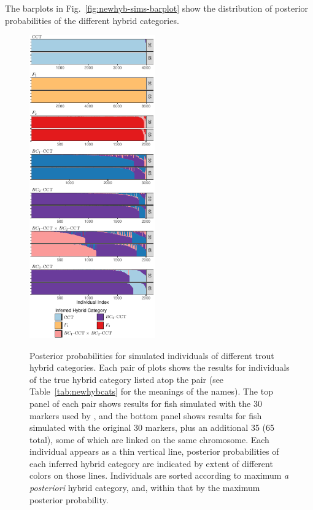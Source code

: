 {The barplots in Fig.~\ref{fig:newhyb-sims-barplot} show the distribution of posterior
probabilities of the different hybrid categories. 
\begin{figure}
\newcommand{\nhbpcap}{\footnotesize Posterior probabilities for simulated
individuals of different trout hybrid categories.  Each pair of plots shows the results
for individuals of the true hybrid category listed atop the pair  (see
 Table~\protect\ref{tab:newhybcats} for the meanings of the names).  The top panel of each pair
shows results for fish simulated with the 30 markers used by \protect\citet{rizza2023limited}, and the bottom panel shows results for fish simulated with the original 30 markers,
plus an additional  35 (65 total), some of which are linked
on the same chromosome. Each individual appears as a thin vertical line, posterior probabilities of
each inferred hybrid category are indicated by extent of different colors on those lines.  Individuals
are sorted according to maximum {\em a posteriori} hybrid category, and, within that by the
maximum posterior probability. }
{\centering
\includegraphics[width=0.48\textwidth]{figures/newhybs-texed-crop.pdf}
}
\caption[\nhbpcap]{\nhbpcap}

\end{figure}}
